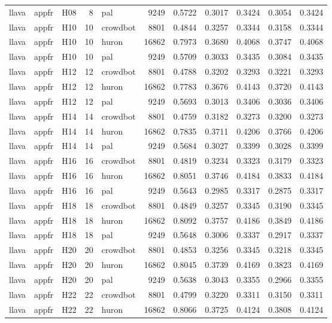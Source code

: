 \begin{table}[tbp]
\begin{tabular}{lllrlrrrrrr}
llava & appfr & H08 & 8 & pal & 9249 & 0.5722 & 0.3017 & 0.3424 & 0.3054 & 0.3424 \\
llava & appfr & H10 & 10 & crowdbot & 8801 & 0.4844 & 0.3257 & 0.3344 & 0.3158 & 0.3344 \\
llava & appfr & H10 & 10 & huron & 16862 & 0.7973 & 0.3680 & 0.4068 & 0.3747 & 0.4068 \\
llava & appfr & H10 & 10 & pal & 9249 & 0.5709 & 0.3033 & 0.3435 & 0.3084 & 0.3435 \\
llava & appfr & H12 & 12 & crowdbot & 8801 & 0.4788 & 0.3202 & 0.3293 & 0.3221 & 0.3293 \\
llava & appfr & H12 & 12 & huron & 16862 & 0.7783 & 0.3676 & 0.4143 & 0.3720 & 0.4143 \\
llava & appfr & H12 & 12 & pal & 9249 & 0.5693 & 0.3013 & 0.3406 & 0.3036 & 0.3406 \\
llava & appfr & H14 & 14 & crowdbot & 8801 & 0.4759 & 0.3182 & 0.3273 & 0.3200 & 0.3273 \\
llava & appfr & H14 & 14 & huron & 16862 & 0.7835 & 0.3711 & 0.4206 & 0.3766 & 0.4206 \\
llava & appfr & H14 & 14 & pal & 9249 & 0.5684 & 0.3027 & 0.3399 & 0.3028 & 0.3399 \\
llava & appfr & H16 & 16 & crowdbot & 8801 & 0.4819 & 0.3234 & 0.3323 & 0.3179 & 0.3323 \\
llava & appfr & H16 & 16 & huron & 16862 & 0.8051 & 0.3746 & 0.4184 & 0.3833 & 0.4184 \\
llava & appfr & H16 & 16 & pal & 9249 & 0.5643 & 0.2985 & 0.3317 & 0.2875 & 0.3317 \\
llava & appfr & H18 & 18 & crowdbot & 8801 & 0.4849 & 0.3257 & 0.3345 & 0.3190 & 0.3345 \\
llava & appfr & H18 & 18 & huron & 16862 & 0.8092 & 0.3757 & 0.4186 & 0.3849 & 0.4186 \\
llava & appfr & H18 & 18 & pal & 9249 & 0.5648 & 0.3006 & 0.3337 & 0.2917 & 0.3337 \\
llava & appfr & H20 & 20 & crowdbot & 8801 & 0.4853 & 0.3256 & 0.3345 & 0.3218 & 0.3345 \\
llava & appfr & H20 & 20 & huron & 16862 & 0.8045 & 0.3739 & 0.4169 & 0.3823 & 0.4169 \\
llava & appfr & H20 & 20 & pal & 9249 & 0.5638 & 0.3043 & 0.3355 & 0.2966 & 0.3355 \\
llava & appfr & H22 & 22 & crowdbot & 8801 & 0.4799 & 0.3220 & 0.3311 & 0.3150 & 0.3311 \\
llava & appfr & H22 & 22 & huron & 16862 & 0.8066 & 0.3725 & 0.4124 & 0.3808 & 0.4124 \\

\end{tabular}
\end{table}
